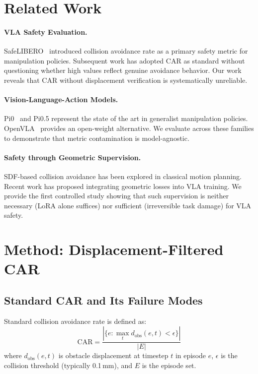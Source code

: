 \documentclass[letterpaper]{article}
\begin{document}
\section{Related Work}
\label{sec:related}

\paragraph{VLA Safety Evaluation.}
SafeLIBERO~\cite{safelibero} introduced collision avoidance rate as a primary safety metric for manipulation policies. Subsequent work has adopted CAR as standard without questioning whether high values reflect genuine avoidance behavior. Our work reveals that CAR without displacement verification is systematically unreliable.

\paragraph{Vision-Language-Action Models.}
Pi0~\cite{pi0} and Pi0.5 represent the state of the art in generalist manipulation policies. OpenVLA~\cite{openvla} provides an open-weight alternative. We evaluate across these families to demonstrate that metric contamination is model-agnostic.

\paragraph{Safety through Geometric Supervision.}
SDF-based collision avoidance has been explored in classical motion planning. Recent work has proposed integrating geometric losses into VLA training. We provide the first controlled study showing that such supervision is neither necessary (LoRA alone suffices) nor sufficient (irreversible task damage) for VLA safety.

\section{Method: Displacement-Filtered CAR}
\label{sec:method}

\subsection{Standard CAR and Its Failure Modes}

Standard collision avoidance rate is defined as:
\begin{equation}
    \text{CAR} = \frac{|\{e : \max_t d_{\text{obs}}(e, t) < \epsilon\}|}{|E|}
\end{equation}
where $d_{\text{obs}}(e, t)$ is obstacle displacement at timestep $t$ in episode $e$, $\epsilon$ is the collision threshold (typically 0.1\,mm), and $E$ is the episode set.
\end{document}
